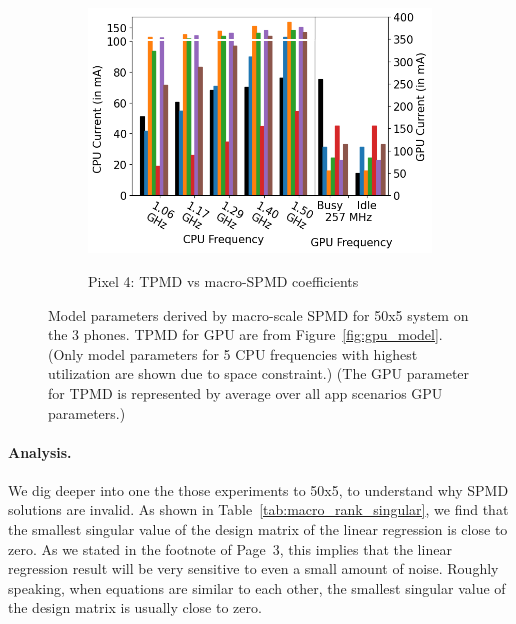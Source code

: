 \begin{figure}[tb]
\begin{subfigure}[b]{0.32\textwidth}
         \includegraphics[width=\textwidth]{figures/004_Pixel4_250_5_macro_equations.png}
         \label{fig:macro_equations_p4}
         \vspace{-0.25in}
         \caption{Pixel 4: TPMD vs macro-SPMD coefficients}
     \end{subfigure}

    \caption{Model parameters derived by macro-scale SPMD for 50x5 system on the
        3 phones. TPMD for GPU are from Figure~\ref{fig:gpu_model}.
        (Only model parameters for 5 CPU frequencies with highest utilization are
        shown due to space constraint.) (The GPU parameter for TPMD
        is represented by average over all app scenarios GPU parameters.)}
    \label{fig:macro_equations}
\end{figure}

\paragraph{Analysis.}
{\color{blue}We dig deeper into one the those experiments to \ie 50x5, to
understand why SPMD solutions are invalid. As shown in Table~\ref{tab:macro_rank_singular}, we find that the smallest singular value of the design matrix of the linear regression is close to zero. As we stated in the footnote of Page~3, this implies that the linear regression result will be very sensitive to even a small amount of noise. Roughly speaking, when equations are similar to each other, the smallest singular value of the design matrix is usually close to zero. }



